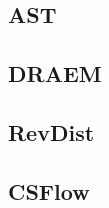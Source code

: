 \subsection{AST}
\label{subsec:AST}

\subsection{DRAEM}
\label{subsec:DRAEM}

\subsection{RevDist}
\label{subsec:revdist}

\subsection{CSFlow}
\label{subsec:csflow}





